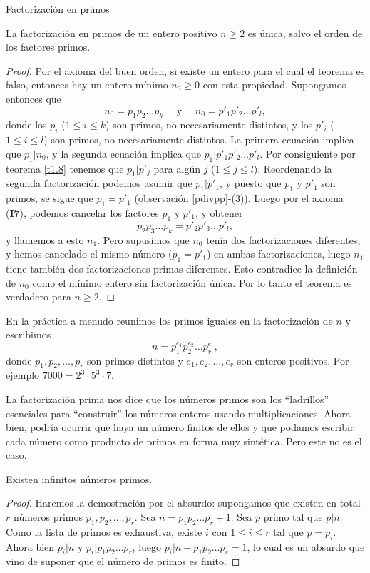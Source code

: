 \begin{section}{Factorización en primos}
\begin{teorema}\label{t1.8.2} La factorización en primos de un entero positivo $n\ge 2$ es única, salvo el orden de los factores primos.
\end{teorema}
\begin{proof} Por el axioma del buen orden, si existe un entero para el cual el teorema es falso, entonces hay un entero mínimo $n_0\ge 0$ con esta propiedad. Supongamos entonces que 
$$
n_0= p_1p_2\ldots p_k\quad\text{ y }\quad n_0= p'_1p'_2\ldots p'_l,
$$
donde los $p_i$ ($1\le i \le k$) son primos, no necesariamente distintos, y los $p'_i$ ($1\le i \le l$) son primos, no necesariamente distintos. La primera ecuación implica que $p_1|n_0$, y la segunda ecuación implica que $p_1 | p'_1p'_2\ldots p'_l$. Por consiguiente por teorema \ref{t1.8} tenemos que $p_1|p'_j$ para algún $j$ ($1\le j \le l$). Reordenando la segunda factorización podemos asumir que $p_1 | p'_1$, y puesto que $p_1$ y $p'_1$ son primos, se sigue que $p_1=p'_1$ (observación \ref{pdivpp}-(3)). Luego por el axioma (\textbf{I7}), podemos cancelar los factores $p_1$ y $p'_1$, y obtener
$$
p_2p_3 \ldots p_k = p'_2p'_3 \ldots p'_l,
$$
y llamemos a esto $n_1$. Pero supusimos que $n_0$ tenía dos factorizaciones diferentes, y hemos cancelado el mismo número ($p_1=p'_1$) en ambas factorizaciones, luego $n_1$ tiene también dos factorizaciones primas diferentes. Esto contradice la definición de $n_0$ como el mínimo entero sin factorización única. Por lo tanto el teorema es verdadero para $n\ge 2$.
\end{proof}

En la práctica a menudo reunimos los primos iguales en la factorización de $n$ y escribimos
\begin{equation*}
n=p_1^{e_1}p_2^{e_2}\ldots p_r^{e_r},
\end{equation*}
donde $p_1,p_2,\ldots ,p_r$ son primos distintos y $e_1,e_2,\ldots,e_r$ son enteros positivos. Por ejemplo $ 7000 = 2^3 \cdot 5^3 \cdot 7$.

La factorización prima nos dice que los números primos son los  ``ladrillos'' esenciales para  ``cons\-truir'' los números enteros usando multiplicaciones. Ahora bien, podría ocurrir que haya un número finitos de ellos y que podamos escribir cada número como producto de primos en forma muy sintética. Pero este no es el caso.

\begin{proposicion} Existen infinitos números primos. 
\end{proposicion} 
\begin{proof} Haremos la demostración por el absurdo: supongamos que existen en total $r$ números primos $p_1,p_2,\ldots, p_r$. Sea $n =  p_1p_2\ldots p_r+1$. Sea $p$ primo tal que $p|n$. Como la lista de primos es exhaustiva, existe $i$ con $1 \le i \le r$ tal que $p=p_i$. Ahora bien $p_i| n$ y $p_i|p_1p_2\ldots p_r$, luego $p_i|n-p_1p_2\ldots p_r =1$, lo cual es un absurdo que vino de suponer que el número de primos es finito.  
\end{proof}




\end{section}
